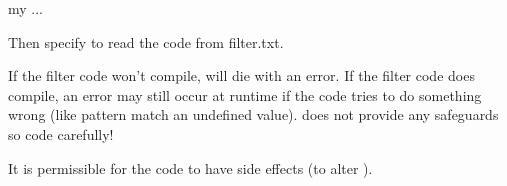 \documentclass[letterpaper,10pt,english]{sphinxmanual}
\begin{document}
\begin{fulllineitems}
\begin{sphinxVerbatim}[commandchars=\\\{\}]
my   ...        
\end{sphinxVerbatim}

\sphinxAtStartPar
Then specify  to read the code from filter.txt.

\sphinxAtStartPar
If the filter code won’t compile,  will die with an error.
If the filter code does compile, an error may still occur at runtime if the
code tries to do something wrong (like pattern match an undefined value).
 does not provide any safeguards so code carefully!

\sphinxAtStartPar
It is permissible for the code to have side effects (to alter ).

\end{fulllineitems}

\end{document}
